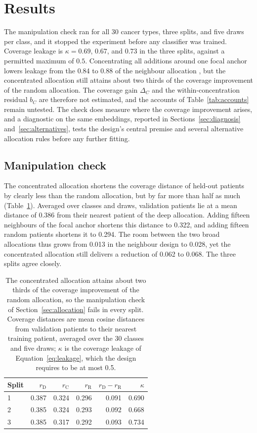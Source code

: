 \section{Results}
\label{sec:results}
The manipulation check ran for all 30 cancer types, three splits, and five draws per class, and it stopped the experiment before any classifier was trained. Coverage leakage is $\kappa=0.69$, $0.67$, and $0.73$ in the three splits, against a permitted maximum of $0.5$. Concentrating all additions around one focal anchor lowers leakage from the 0.84 to 0.88 of the neighbour allocation \citep{queisler2026patientCoverage}, but the concentrated allocation still attains about two thirds of the coverage improvement of the random allocation. The coverage gain $\Delta_C$ and the within-concentration residual $b_C$ are therefore not estimated, and the accounts of Table~\ref{tab:accounts} remain untested. The check does measure where the coverage improvement arises, and a diagnostic on the same embeddings, reported in Sections~\ref{sec:diagnosis} and~\ref{sec:alternatives}, tests the design's central premise and several alternative allocation rules before any further fitting.

\subsection{Manipulation check}
\label{sec:check-results}
The concentrated allocation shortens the coverage distance of held-out patients by clearly less than the random allocation, but by far more than half as much (Table~\ref{tab:check}). Averaged over classes and draws, validation patients lie at a mean distance of 0.386 from their nearest patient of the deep allocation. Adding fifteen neighbours of the focal anchor shortens this distance to 0.322, and adding fifteen random patients shortens it to 0.294. The room between the two broad allocations thus grows from 0.013 in the neighbour design to 0.028, yet the concentrated allocation still delivers a reduction of 0.062 to 0.068. The three splits agree closely.

\begin{table}[htbp]
\centering
\renewcommand{\arraystretch}{1.15}
\begin{tabular}{@{}lrrrrr@{}}
\toprule
Split & $r_{\mathrm D}$ & $r_{\mathrm C}$ & $r_{\mathrm R}$ & $r_{\mathrm D}-r_{\mathrm R}$ & $\kappa$ \\
\midrule
1 & 0.387 & 0.324 & 0.296 & 0.091 & 0.690 \\
2 & 0.385 & 0.324 & 0.293 & 0.092 & 0.668 \\
3 & 0.385 & 0.317 & 0.292 & 0.093 & 0.734 \\
\bottomrule
\end{tabular}
\caption{The concentrated allocation attains about two thirds of the coverage improvement of the random allocation, so the manipulation check of Section~\ref{sec:allocation} fails in every split. Coverage distances are mean cosine distances from validation patients to their nearest training patient, averaged over the 30 classes and five draws; $\kappa$ is the coverage leakage of Equation~\eqref{eq:leakage}, which the design requires to be at most 0.5.}
\label{tab:check}
\end{table}

